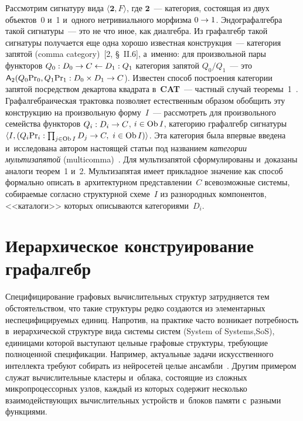 \begin{multicols}{2}
  Рассмотрим сигнатуру вида $\langle\boldsymbol{2}, F\rangle$, где 
$\boldsymbol{2}$~--- категория, со\-сто\-ящая из двух объектов~0 и~1 и~одного 
нетривиального морфизма $0\hm\to 1$. Эн\-до\-граф\-ал\-геб\-ра такой сигнатуры~--- 
это не что иное, как ди\-ал\-геб\-ра. Из граф\-ал\-гебр такой сигнатуры получается еще 
одна хорошо известная конструкция~--- категория запятой (comma category)~[2, \S~II.6], 
а~именно: для произвольной пары функторов $Q_0 : D_0 \hm\to C 
\hm\leftarrow D_1 : Q_1$ категория запятой $Q_0/Q_1$~--- это\linebreak ${\sf A}_2(Q_0\mathrm{Pr}_0, 
Q_1\mathrm{Pr}_1 : D_0\times  D_1 \hm\to  C$). Известен способ по\-стро\-ения категории 
запятой посредством декартова квад\-ра\-та в~\textbf{CAT}~--- част\-ный случай 
тео\-ре\-мы~1~\cite{13-kov}. Графал\-геб\-ра\-иче\-ская трак\-тов\-ка \mbox{позволяет} 
естественным образом обобщить эту конструкцию на произвольную 
форму~$I$~--- рас\-смот\-реть для произвольного семейства функторов $Q_i : D_i 
\hm\to  C$, $i\hm\in \mathrm{Ob}\,I$, категорию графалгебр сигнатуры $\langle 
I, (Q_i\mathrm{Pr}_i : \prod_{j \in \mathrm{Ob}\,I} D_j \hm\to C,\ i \hm\in \mathrm{Ob}\,I)\rangle$. 
Эта категория была впервые введена и~исследована автором на\-сто\-ящей статьи 
под названием \textit{категории мультизапятой} (multicomma)~\cite{14-kov}. 
Для мультизапятой сформулированы и~доказаны аналоги тео\-рем~1 и~2. 
Мультизапятая имеет прикладное значение как способ формально описать 
в~архитектурном пред\-став\-ле\-нии~$C$ все\-воз\-мож\-ные сис\-те\-мы, со\-би\-ра\-емые со\-глас\-но 
структурной схеме~$I$ из разнородных компонентов, <<каталоги>> которых 
описываются категориями~$D_i$.
  
\section{Иерархическое конструирование графалгебр}

  Специфицирование графовых вычислительных структур затрудняется тем 
обстоятельством, что такие структуры ред\-ко создаются из элементарных 
не\-спе\-ци\-фи\-ци\-ру\-емых единиц. Напротив, на практике часто возникает 
потребность в~иерархической структуре вида сис\-те\-мы сис\-тем (System of 
Systems,\linebreak SoS), единицами которой вы\-сту\-па\-ют цельные графовые структуры, 
требующие полноценной спецификации. Например, актуальные задачи 
искусственного интеллекта требуют собирать из \mbox{нейросетей} целые 
ан\-самб\-ли~\cite{15-kov}. Другим примером служат вы\-чис\-ли\-тель\-ные клас\-те\-ры 
и~облака, со\-сто\-ящие из сложных мик\-ро\-про\-цес\-сор\-ных узлов, каждый из 
которых содержит несколько вза\-имо\-дей\-ст\-ву\-ющих вы\-чис\-ли\-тель\-ных устройств 
и~блоков памяти с~разными функциями.
  

\end{multicols}
